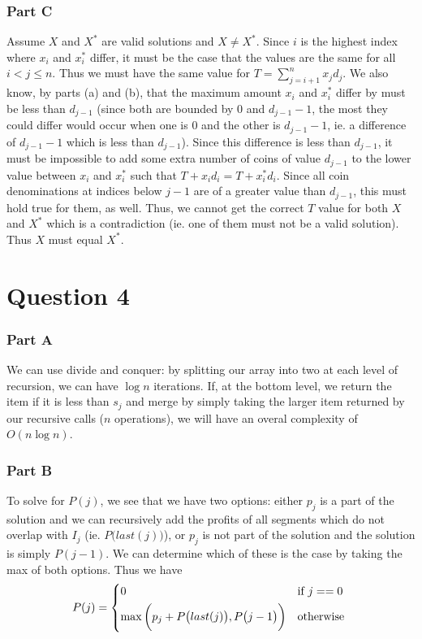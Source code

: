 \documentclass[12pt]{article}
\begin{document}
\subsubsection*{Part C}
Assume $X$ and $X^*$ are valid solutions and $X \neq X^*$. Since $i$ is the highest index where $x_i$ and $x^*_i$ differ, it must be the case that the values are the same for all $i < j \leq n$. Thus we must have the same value for $T = \displaystyle\sum_{j=i+1}^n x_j d_j$. We also know, by parts (a) and (b), that the maximum amount $x_i$ and $x^*_i$ differ by must be less than $d_{j-1}$ (since both are bounded by $0$ and $d_{j-1} - 1$, the most they could differ would occur when one is $0$ and the other is $d_{j-1} - 1$, ie. a difference of $d_{j-1} - 1$ which is less than $d_{j-1}$). Since this difference is less than $d_{j-1}$, it must be impossible to add some extra number of coins of value $d_{j-1}$ to the lower value between $x_i$ and $x^*_i$ such that $T + x_i d_i = T + x^*_i d_i$. Since all coin denominations at indices below $j-1$ are of a greater value than $d_{j-1}$, this must hold true for them, as well. Thus, we cannot get the correct $T$ value for both $X$ and $X^*$ which is a contradiction (ie. one of them must not be a valid solution). Thus $X$ must equal $X^*$.

\section*{Question 4}
\subsubsection*{Part A}
We can use divide and conquer: by splitting our array into two at each level of recursion, we can have $\log n$ iterations. If, at the bottom level, we return the item if it is less than $s_j$ and merge by simply taking the larger item returned by our recursive calls ($n$ operations), we will have an overal complexity of $O(n\log n)$.

\subsubsection*{Part B}
To solve for $P(j)$, we see that we have two options: either $p_j$ is a part of the solution and we can recursively add the profits of all segments which do not overlap with $I_j$ (ie. $P\bigl(last(j)\bigl)$), or $p_j$ is not part of the solution and the solution is simply $P(j-1)$. We can determine which of these is the case by taking the max of both options. Thus we have \[ P(j) =
\begin{dcases*}
0 & if $j == 0$ \\
\max\bigg(p_j + P\bigl(last(j)\bigl), P\bigl(j-1\bigl)\bigg) & otherwise
\end{dcases*}\]
\end{document}
